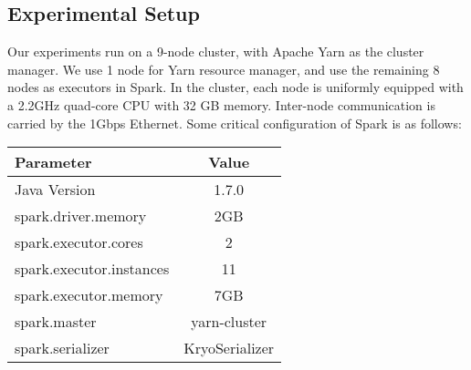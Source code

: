 %


\subsection{Experimental Setup}
Our experiments run on a 9-node cluster, with Apache Yarn as
the cluster manager. We use 1 node for Yarn resource manager, 
and use the remaining 8 nodes as executors in Spark. In the 
cluster, each node is uniformly equipped with a 2.2GHz quad-core CPU
with 32 GB memory. Inter-node communication is carried by 
the 1Gbps Ethernet.  Some critical configuration of Spark is 
as follows:
\begin{table} [h]
\centering
\begin{tabular}{|l|c|}
\hline 
Parameter & Value  \\ 
\hline 
Java Version & 1.7.0 \\ 
\hline 
spark.driver.memory & 2GB \\ 
\hline 
spark.executor.cores & 2  \\ 
\hline 
spark.executor.instances & 11 \\ 
\hline 
spark.executor.memory & 7GB \\ 
\hline 
spark.master & yarn-cluster \\
\hline 
spark.serializer & KryoSerializer \\ 
\hline 
\end{tabular} 
\end{table}

